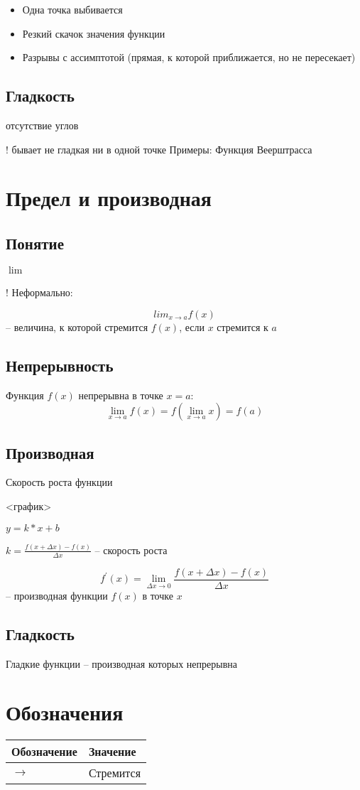 \documentclass{article}
\begin{document}
\begin{itemize}
    \item Одна точка выбивается
    \item Резкий скачок значения функции
    \item Разрывы с ассимптотой (прямая, к которой приближается, но не пересекает)
\end{itemize}

\subsection{Гладкость}
отсутствие углов

! бывает не гладкая ни в одной точке
Примеры:
Функция Веерштрасса


\section{Предел и производная}
\subsection{Понятие}
$\lim_{}$

! Неформально:

$$lim_{x \to a} f(x)$$ -- величина, к которой стремится $f(x)$, если $x$ стремится к $a$

\subsection{Непрерывность}
Функция \textsl{}$f(x)$ непрерывна в точке $x=a$: $$\lim_{x \to a} f(x) = f(\lim_{x \to a} x) = f(a)$$

\subsection{Производная}
Скорость роста функции

<график>

$y = k*x + b$

$k = \frac{f(x + \Delta x) - f(x)}{\Delta x}$ -- скорость роста

$$f^\prime(x) = \lim_{\Delta x \to 0} \frac{f(x + \Delta x) - f(x)}{\Delta x}$$ -- производная функции $f(x)$ в точке $x$

\subsection{Гладкость}
Гладкие функции -- производная которых непрерывна




\section{Обозначения}
\begin{tabular}{ | l | l | }
	\hline
	Обозначение & Значение \\ \hline
	$\to$ & Стремится \\
	\hline
\end{tabular}





\end{document}
